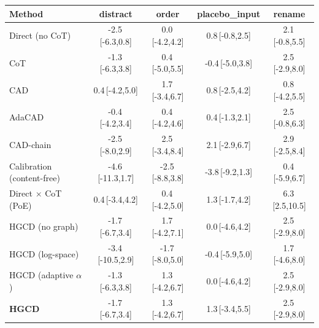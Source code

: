 \begin{tabular}{lcccc}
\toprule
Method & distract & order & placebo\_input & rename \\
\midrule
Direct (no CoT) & -2.5\,{\scriptsize[-6.3,0.8]} & 0.0\,{\scriptsize[-4.2,4.2]} & 0.8\,{\scriptsize[-0.8,2.5]} & 2.1\,{\scriptsize[-0.8,5.5]} \\
CoT & -1.3\,{\scriptsize[-6.3,3.8]} & 0.4\,{\scriptsize[-5.0,5.5]} & -0.4\,{\scriptsize[-5.0,3.8]} & 2.5\,{\scriptsize[-2.9,8.0]} \\
CAD & 0.4\,{\scriptsize[-4.2,5.0]} & 1.7\,{\scriptsize[-3.4,6.7]} & 0.8\,{\scriptsize[-2.5,4.2]} & 0.8\,{\scriptsize[-4.2,5.5]} \\
AdaCAD & -0.4\,{\scriptsize[-4.2,3.4]} & 0.4\,{\scriptsize[-4.2,4.6]} & 0.4\,{\scriptsize[-1.3,2.1]} & 2.5\,{\scriptsize[-0.8,6.3]} \\
CAD-chain & -2.5\,{\scriptsize[-8.0,2.9]} & 2.5\,{\scriptsize[-3.4,8.4]} & 2.1\,{\scriptsize[-2.9,6.7]} & 2.9\,{\scriptsize[-2.5,8.4]} \\
Calibration (content-free) & -4.6\,{\scriptsize[-11.3,1.7]} & -2.5\,{\scriptsize[-8.8,3.8]} & -3.8\,{\scriptsize[-9.2,1.3]} & 0.4\,{\scriptsize[-5.9,6.7]} \\
Direct $\times$ CoT (PoE) & 0.4\,{\scriptsize[-3.4,4.2]} & 0.4\,{\scriptsize[-4.2,5.0]} & 1.3\,{\scriptsize[-1.7,4.2]} & 6.3\,{\scriptsize[2.5,10.5]} \\
HGCD (no graph) & -1.7\,{\scriptsize[-6.7,3.4]} & 1.7\,{\scriptsize[-4.2,7.1]} & 0.0\,{\scriptsize[-4.6,4.2]} & 2.5\,{\scriptsize[-2.9,8.0]} \\
HGCD (log-space) & -3.4\,{\scriptsize[-10.5,2.9]} & -1.7\,{\scriptsize[-8.0,5.0]} & -0.4\,{\scriptsize[-5.9,5.0]} & 1.7\,{\scriptsize[-4.6,8.0]} \\
HGCD (adaptive $\alpha$) & -1.3\,{\scriptsize[-6.3,3.8]} & 1.3\,{\scriptsize[-4.2,6.7]} & 0.0\,{\scriptsize[-4.6,4.2]} & 2.5\,{\scriptsize[-2.9,8.0]} \\
\textbf{HGCD} & -1.7\,{\scriptsize[-6.7,3.4]} & 1.3\,{\scriptsize[-4.2,6.7]} & 1.3\,{\scriptsize[-3.4,5.5]} & 2.5\,{\scriptsize[-2.9,8.0]} \\
\bottomrule
\end{tabular}
